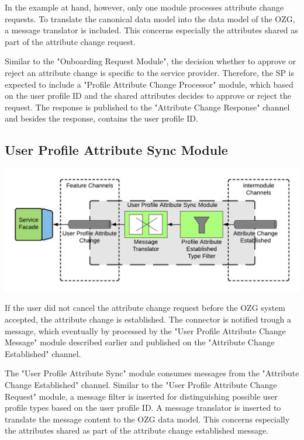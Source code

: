 In the example at hand, however, only one module processes attribute change requests. To translate the canonical data model into the data model of the OZG, a message translator is included. This concerns especially the attributes shared as part of the attribute change request.

Similar to the "Onboarding Request Module", the decision whether to approve or reject an attribute change is specific to the service provider. Therefore, the SP is expected to include a "Profile Attribute Change Processor" module, which based on the user profile ID and the shared attributes decides to approve or reject the request. The response is published to the "Attribute Change Response" channel and besides the response, contains the user profile ID.

\subsection{User Profile Attribute Sync Module}

\begin{center}
    \includegraphics[scale=0.6]{Diagrams/Integration Architecture 1/Technological Integration/13. User Profile Attribute Sync Module.pdf}
\end{center}

If the user did not cancel the attribute change request before the OZG system accepted, the attribute change is established. The connector is notified trough a message, which eventually by processed by the "User Profile Attribute Change Message" module described earlier and published on the "Attribute Change Established" channel.

The "User Profile Attribute Sync" module consumes messages from the "Attribute Change Established" channel. Similar to the "User Profile Attribute Change Request" module, a message filter is inserted for distinguishing possible user profile types based on the user profile ID. A message translator is inserted to translate the message content to the OZG data model. This concerns especially the attributes shared as part of the attribute change established message.

